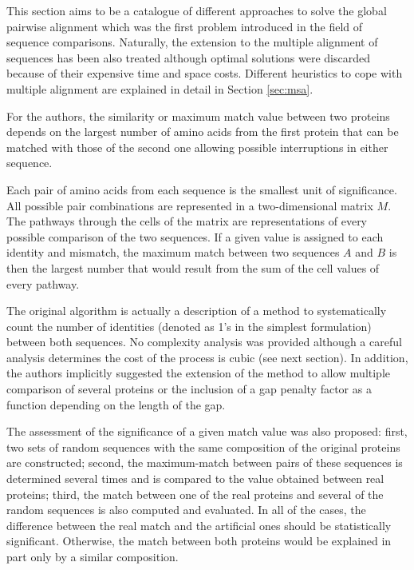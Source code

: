 \label{sec:global}

This section aims to be a catalogue of different approaches to solve the global pairwise alignment which
was the first problem introduced in the field of sequence comparisons. Naturally, the extension to the
multiple alignment of sequences has been also treated although optimal solutions were discarded because of 
their expensive time and space costs. Different heuristics to cope with multiple alignment are explained 
in detail in Section \ref{sec:msa}.

\label{nw}

 
For the authors, the similarity or maximum match value between two proteins depends on the largest number
of amino acids from the first protein that can be matched with those of the second one allowing possible 
interruptions in either sequence. 

Each pair of amino acids from each sequence is the smallest unit of significance. All possible pair 
combinations are represented in a two-dimensional matrix $M$. The pathways through the cells of the 
matrix are representations of every possible comparison of the two sequences. If a given value is 
assigned to each identity and mismatch, the maximum match between two sequences $A$ and $B$ is then 
the largest number that would result from the sum of the cell values of every pathway.

The original \citeauthor{needleman:1970a} algorithm is actually a description of a method to 
systematically count the number of identities (denoted as 1's in the simplest formulation) between both 
sequences. No complexity analysis was provided although a careful analysis determines the cost of the
process is cubic (see next section). In addition, the authors implicitly suggested the extension of 
the method to allow multiple comparison of several proteins or the inclusion of a gap penalty factor as 
a function depending on the length of the gap.

The assessment of the significance of a given match value was also proposed: first, two sets of random 
sequences with the same composition of the original proteins are constructed; second, the maximum-match 
between pairs of these sequences is determined several times and is compared to the value obtained between 
real proteins; third, the match between one of the real proteins and several of the random sequences 
is also computed and evaluated. In all of the cases, the difference between the real match and the 
artificial ones should be statistically significant. Otherwise, the match between both proteins would be 
explained in part only by a similar composition.

